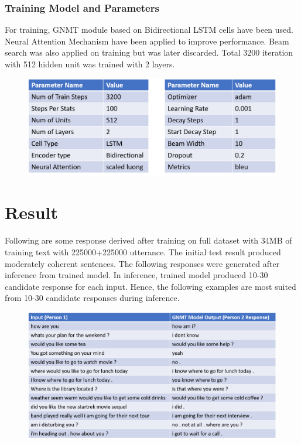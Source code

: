 \documentclass[a4paper,12pt]{report}
\begin{document}
\subsection {Training Model and Parameters}
For training, GNMT module based on Bidirectional LSTM cells have been used. Neural Attention Mechanism have been applied to improve performance. Beam search was also applied on training but was later discarded. Total 3200 iteration with 512 hidden unit was trained with 2 layers.
\begin{figure}[H]
\begin{center}
\includegraphics[scale=.7]{training_parameter}
\end{center}
\end{figure}
{\let\clearpage\relax \chapter {Result}}
\noindent Following are some response derived after training on full dataset with 34MB of training text with 225000+225000 utterance. The initial test result produced moderately coherent sentences. The following responses were generated after inference from trained model. In inference, trained model produced 10-30 candidate response for each input. Hence, the following examples are most suited from 10-30 candidate responses during inference.  
\begin{figure}[H]
\begin{center}
\includegraphics[scale=.6]{chat_gen}
\end{center}
\end{figure}
\end{document}
